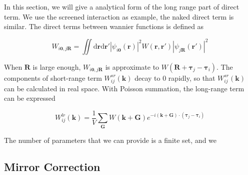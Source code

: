 In this section, we will give a analytical form of the long range part of direct term. 
We use the screened interaction as example, the naked direct term is similar.
The direct terms between wannier functions is defined as

\begin{equation}
  W_{i\boldsymbol{0},j\boldsymbol{R}} 
  = \iint \mathrm{d} \boldsymbol{r} \mathrm{d} \boldsymbol{r}'
      \left| \psi_{i\boldsymbol{0}}^{}(\boldsymbol{r}) \right|^{2} 
      W(\boldsymbol{r},\boldsymbol{r}') 
      \left| \psi_{j\boldsymbol{R}}^{}(\boldsymbol{r}') \right|^{2} 
\end{equation}



\noindent
When $\boldsymbol{R}$ is large enough, 
$W_{i\boldsymbol{0},j\boldsymbol{R}}$ is approximate to $W(\boldsymbol{R} + \boldsymbol{\tau}_j - \boldsymbol{\tau}_i)$.
The components of short-range term $W_{ij}^{sr}(\boldsymbol{k})$ decay to $0$ rapidly, 
so that $W_{ij}^{sr}(\boldsymbol{k})$ can be calculated in real space.
With Poisson summation, the long-range term can be expressed

\begin{equation}
  W_{ij}^{lr}(\boldsymbol{k}) = \frac{1}{V} \sum_{\boldsymbol{G}} W(\boldsymbol{k} + \boldsymbol{G}) 
    e^{-i(\boldsymbol{k} + \boldsymbol{G}) \cdot (\boldsymbol{\tau}_j - \boldsymbol{\tau}_i)}
\end{equation}



The number of parameters that we can provide is a finite set, and we 


\subsection{Mirror Correction}

